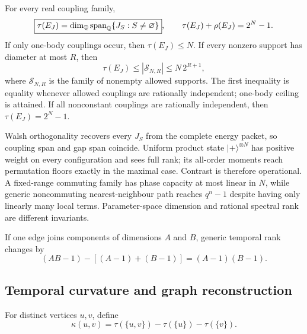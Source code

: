 \begin{theorem}
\label{thm:lbit-classification-main}
For every real coupling family,
\begin{equation}
 \boxed{\tau(E_J)=\dim_\mathbb Q\operatorname{span}_\mathbb Q
   \{J_S:S\ne\varnothing\}},
 \qquad
 \tau(E_J)+\rho(E_J)=2^N-1.                            \label{eq:lbit-rank-main}
\end{equation}
If only one-body couplings occur, then $\tau(E_J)\le N$.  If every
nonzero support has diameter at most $R$, then
\begin{equation}
 \tau(E_J)\le |\mathcal S_{N,R}|\le N\,2^{R+1},       \label{eq:lbit-range-main}
\end{equation}
where $\mathcal S_{N,R}$ is the family of nonempty allowed supports.  The first
inequality is equality whenever allowed couplings are rationally
independent; one-body ceiling is attained.  If all nonconstant couplings
are rationally independent, then $\tau(E_J)=2^N-1$.
\end{theorem}

Walsh orthogonality recovers every $J_S$ from the complete energy packet, so
coupling span and gap span coincide.  Uniform product state
$|+\rangle^{\otimes N}$ has positive weight on every configuration and sees
full rank; its all-order moments reach permutation floors exactly in the maximal
case.  Contrast is therefore operational.  A fixed-range commuting family
has phase capacity at most linear in $N$, while generic noncommuting
nearest-neighbour path reaches $q^n-1$ despite having only linearly many local
terms.  Parameter-space dimension and rational spectral rank are different
invariants.

\begin{corollary}
If one edge joins components of dimensions $A$ and $B$, generic temporal
rank changes by
\begin{equation}
 (AB-1)-[(A-1)+(B-1)]=(A-1)(B-1).                     \label{eq:edgegain}
\end{equation}
\end{corollary}

\subsection{Temporal curvature and graph reconstruction}

For distinct vertices $u,v$, define
\begin{equation}
 \kappa(u,v)=\tau(\{u,v\})-\tau(\{u\})-\tau(\{v\}). \label{eq:paircurvature}
\end{equation}

